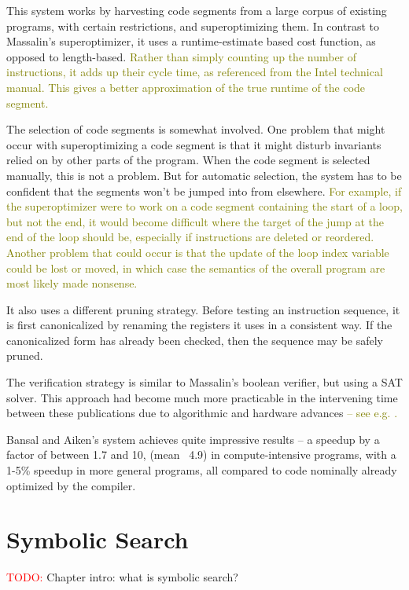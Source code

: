 \documentclass[12pt,twoside]{reedthesis}
\newcommand{\red}[1]{\textcolor{red}{#1}}
\newcommand{\green}[1]{\textcolor{olive}{#1}}
\newcommand{\addressed}[2]{{#1}}
\begin{document}
This system works by harvesting code segments from a large corpus of existing programs, with certain restrictions, and superoptimizing them. 
In contrast to Massalin's superoptimizer, it uses a \addressed{runtime-estimate based cost function}{elaborate on this},
as opposed to length-based.
\green{
Rather than simply counting up the number of instructions, it adds up their cycle time, as referenced from the Intel technical manual.
This gives a better approximation of the true runtime of the code segment.
}
    
The selection of code segments is somewhat involved.
One problem that might occur with superoptimizing a code segment is that it might
\addressed{disturb invariants relied on by other parts of the program}{a small example of this would help clarify}.
When the code segment is selected manually, this is not a problem.
But for automatic selection, the system has to be confident that the segments won't be
\addressed{jumped into from elsewhere}{this could also use an example or more explanation}. 
\green{
For example, if the superoptimizer were to work on a code segment containing the start of a loop, but not the end, it would become difficult where the target of the jump at the end of the loop should be, especially if instructions are deleted or reordered.
Another problem that could occur is that the update of the loop index variable could be lost or moved, in which case the semantics of the overall program are most likely made nonsense.
}
    
It also uses a different pruning strategy.
Before testing an instruction sequence, it is first canonicalized by renaming the registers it uses in a consistent way.
If the canonicalized form has already been checked, then the sequence may be safely pruned.
    
The verification strategy is similar to Massalin's boolean verifier, but using a SAT solver.
This approach had become much more practicable in the intervening time between these publications due to
\addressed{algorithmic and hardware advances}{If this isn't stated in the Bansal/Aiken paper then I would find a citation} 
\green{-- see e.g. \cite{silva1996grasp}.}
    
Bansal and Aiken's system achieves quite impressive results 
    -- a speedup by a factor of between 1.7 and 10, (mean ~4.9) in compute-intensive programs, with a 1-5\% speedup in more general programs, all compared to code nominally already optimized by the compiler.

\chapter{Symbolic Search}
\red{TODO:} Chapter intro: what is symbolic search?
\end{document}
